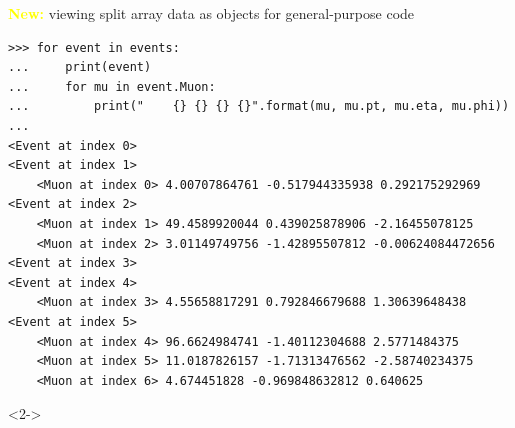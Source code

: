 \documentclass[aspectratio=169]{beamer}
\begin{document}
\begin{frame}[fragile]{\textcolor{yellow}{\bf New:} viewing split array data as objects for general-purpose code}
\vspace{0.1 cm}
\small
\begin{verbatim}
>>> for event in events:
...     print(event)
...     for mu in event.Muon:
...         print("    {} {} {} {}".format(mu, mu.pt, mu.eta, mu.phi))
...
<Event at index 0>
<Event at index 1>
    <Muon at index 0> 4.00707864761 -0.517944335938 0.292175292969
<Event at index 2>
    <Muon at index 1> 49.4589920044 0.439025878906 -2.16455078125
    <Muon at index 2> 3.01149749756 -1.42895507812 -0.00624084472656
<Event at index 3>
<Event at index 4>
    <Muon at index 3> 4.55658817291 0.792846679688 1.30639648438
<Event at index 5>
    <Muon at index 4> 96.6624984741 -1.40112304688 2.5771484375
    <Muon at index 5> 11.0187826157 -1.71313476562 -2.58740234375
    <Muon at index 6> 4.674451828 -0.969848632812 0.640625
\end{verbatim}

\vspace{-5.5 cm}
\begin{uncoverenv}<2->
\begin{center}
\end{center}
\end{uncoverenv}
\vspace{5.5 cm}

\vspace{-10.6 cm}
\hfill {}
\vspace{10.6 cm}
\end{frame}
\end{document}
